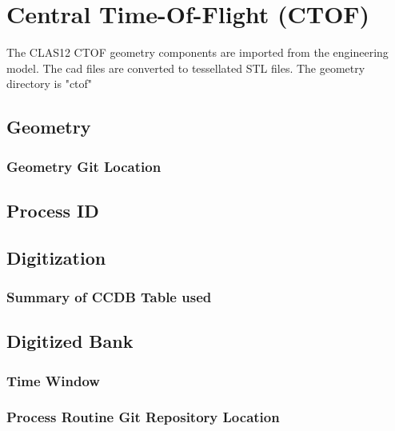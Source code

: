 \section{Central Time-Of-Flight (CTOF)}

The CLAS12 CTOF geometry components are imported from the engineering model. The cad files are converted to tessellated STL files.
The geometry directory is "ctof"

\subsection{Geometry}

\subsubsection{Geometry Git Location}

\subsection{Process ID}

\subsection{Digitization}

\subsubsection{Summary of CCDB Table used}

\subsection{Digitized Bank}

\subsubsection{Time Window}

\subsubsection{Process Routine Git Repository Location}


